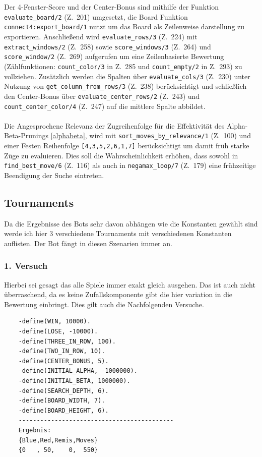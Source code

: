 \newpage

Der 4-Fenster-Score und der Center-Bonus sind mithilfe der Funktion \texttt{evaluate\_board/2} (Z.\ 201) umgesetzt, die Board Funktion \texttt{connect4:export\_board/1} nutzt um das Board als Zeilenweise darstellung zu exportieren. Anschließend wird \texttt{evaluate\_rows/3} (Z.\ 224) mit \texttt{extract\_windows/2} (Z.\ 258) sowie \texttt{score\_windows/3} (Z.\ 264) und \texttt{score\_window/2} (Z.\ 269) aufgerufen um eine Zeilenbasierte Bewertung (Zählfunktionen: \texttt{count\_color/3} in Z.\ 285 und \texttt{count\_empty/2} in Z.\ 293) zu vollziehen. Zusätzlich werden die Spalten über \texttt{evaluate\_cols/3} (Z.\ 230) unter Nutzung von \texttt{get\_column\_from\_rows/3} (Z.\ 238) berücksichtigt und schließlich den Center-Bonus über \texttt{evaluate\_center\_rows/2} (Z.\ 243) und \texttt{count\_center\_color/4} (Z.\ 247) auf die mittlere Spalte abbildet.
\\\\
Die Angesprochene Relevanz der Zugreihenfolge für die Effektivität des Alpha-Beta-Prunings \ref{alphabeta}, wird mit \texttt{sort\_moves\_by\_relevance/1} (Z.\ 100) und einer Festen Reihenfolge \texttt{[4,3,5,2,6,1,7]} berücksichtigt um damit früh starke Züge zu evaluieren. Dies soll die Wahrscheinlichkeit erhöhen, dass sowohl in \texttt{find\_best\_move/6} (Z.\ 116) als auch in \texttt{negamax\_loop/7} (Z.\ 179) eine frühzeitige Beendigung der Suche eintreten.

\newpage
\subsection{Tournaments}

Da die Ergebnisse des Bots sehr davon abhängen wie die Konstanten gewählt sind werde ich hier 3 verschiedene Tournaments mit verschiedenen Konstanten auflisten. Der Bot fängt in diesen Szenarien immer an.

\subsubsection{1. Versuch}

Hierbei sei gesagt das alle Spiele immer exakt gleich ausgehen. Das ist auch nicht überraschend, da es keine Zufallskomponente gibt die hier variation in die Bewertung einbringt. Dies gilt auch die Nachfolgenden Versuche.

\begin{verbatim}
	-define(WIN, 10000).
	-define(LOSE, -10000).
	-define(THREE_IN_ROW, 100).
	-define(TWO_IN_ROW, 10).
	-define(CENTER_BONUS, 5).
	-define(INITIAL_ALPHA, -1000000).
	-define(INITIAL_BETA, 1000000).
	-define(SEARCH_DEPTH, 6).
	-define(BOARD_WIDTH, 7).
	-define(BOARD_HEIGHT, 6).
	-------------------------------------------
	Ergebnis:
	{Blue,Red,Remis,Moves}
	{0   , 50,    0,  550}
\end{verbatim}


